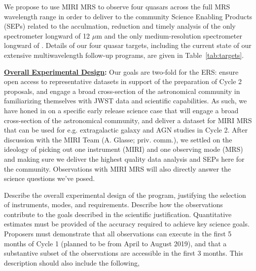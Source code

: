 
\smallskip \smallskip
\noindent
We propose to use MIRI MRS to observe four quasars across the full 
MRS wavelength range in order to deliver to the community Science 
Enabling Products (SEPs) related to the acculmation, reduction and 
timely analysis of the only spectrometer longward of 12 $\mu$m 
and the only medium-resolution spectrometer longward of 
. Details of our
four quasar targets, including the current state of our extensive
multiwavelength follow-up programs, are given in
Table~\ref{tab:targets}.

\smallskip \smallskip
\noindent
{\bf \underline{Overall Experimental Design}:} 
Our goals are two-fold for the ERS: ensure open access to representative datasets in support of the preparation of Cycle 2 proposals, and engage a broad cross-section of the astronomical community in familiarizing themselves with JWST data and scientific capabilities.
As such, we have honed in on a specific early release science case that will engage a broad cross-section of the astronomical community, and deliver a dataset for MIRI MRS that can be used for e.g. extragalactic galaxy and AGN studies in Cycle 2. 
After discussion with the MIRI Team (A. Glasse; priv. comm.), we settled on the ideology of picking out one
instrument (MIRI) and one observing mode (MRS) and making sure we deliver the highest quality data analysis and SEPs here for the community. Observations with MIRI MRS will also directly answer the science questions we've posed. 

\smallskip \smallskip
\noindent
Describe the overall experimental design of the program, justifying the selection of instruments, modes, and requirements. Describe how the observations contribute to the goals described in the scientific justification. Quantitative estimates must be provided of the accuracy required to achieve key science goals. Proposers must demonstrate that all observations can execute in the first 5 months of Cycle 1 (planned to be from April to August 2019), and that a substantive subset of the observations are accessible in the first 3 months. This description should also include the following,


